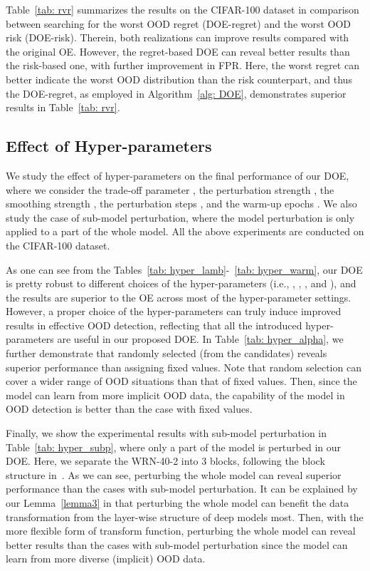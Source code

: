 \documentclass{article} \usepackage{iclr2022_conference,times}
\begin{document}
Table~\ref{tab: rvr} summarizes the results on the CIFAR-100 dataset in comparison between searching for the worst OOD regret (DOE-regret) and the worst OOD risk (DOE-risk). Therein, both realizations can improve results compared with the original OE. However, the regret-based DOE can reveal better results than the risk-based one, with  further improvement in FPR. Here, the worst regret can better indicate the worst OOD distribution than the risk counterpart, and thus the DOE-regret, as employed in Algorithm~\ref{alg: DOE}, demonstrates superior results in Table~\ref{tab: rvr}.



\subsection{Effect of Hyper-parameters} 

We study the effect of hyper-parameters on the final performance of our DOE, where we consider the trade-off parameter , the perturbation strength , the smoothing strength , the perturbation steps , and the warm-up epochs . We also study the case of sub-model perturbation, where the model perturbation is only applied to a part of the whole model. All the above experiments are conducted on the CIFAR-100 dataset.

As one can see from the Tables~\ref{tab: hyper_lamb}-~\ref{tab: hyper_warm}, our DOE is pretty robust to different choices of the hyper-parameters (i.e., , , , and ), and the results are superior to the OE across most of the hyper-parameter settings. However, a proper choice of the hyper-parameters can truly induce improved results in effective OOD detection, reflecting that all the introduced hyper-parameters are useful in our proposed DOE. In Table~\ref{tab: hyper_alpha}, we further demonstrate that randomly selected  (from the candidates) reveals superior performance than assigning fixed values. Note that random selection can cover a wider range of OOD situations than that of fixed values. Then, since the model can learn from more implicit OOD data, the capability of the model in OOD detection is better than the case with fixed values. 

Finally, we show the experimental results with sub-model perturbation in Table~\ref{tab: hyper_subp}, where only a part of the model is perturbed in our DOE. Here, we separate the WRN-40-2 into 3 blocks, following the block structure in~\citep{zagoruyko2016wide}. As we can see, perturbing the whole model can reveal superior performance than the cases with sub-model perturbation. It can be explained by our Lemma~\ref{lemma3} in that perturbing the whole model can benefit the data transformation from the layer-wise structure of deep models most. Then, with the more flexible form of transform function, perturbing the whole model can reveal better results than the cases with sub-model perturbation since the model can learn from more diverse (implicit) OOD data. 
\end{document}
